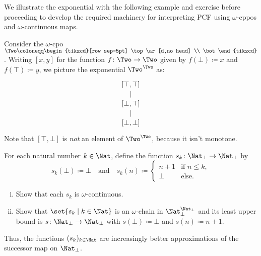 We illustrate the exponential with the following example and exercise before
proceeding to develop the required machinery for interpreting PCF using
\(\omega\)-cppos and \(\omega\)-continuous maps.

\begin{example}
  Consider the \(\omega\)-cpo \(\Two \coloneqq
  \begin{tikzcd}[row sep=5pt]
    \top \ar[d,no head] \\ \bot
  \end{tikzcd}\). Writing \([x,y]\) for the function
  \({f \colon \Two \to \Two}\) given by \(f(\bot) \coloneqq x\) and
  \(f(\top) \coloneqq y\), we picture the exponential \(\Two^\Two\) as:
  \[
  \begin{tikzcd}[row sep=10pt]
    {[\top,\top]} \ar[d, no head] \\
    {[\bot,\top]} \ar[d, no head] \\
    {[\bot,\bot]}
  \end{tikzcd}
  \]
  Note that \([\top,\bot]\) is \emph{not} an element of \(\Two^\Two\), because
  it isn't monotone.
\end{example}

\begin{exercise}\label{exer:approximating-successor}
  For each natural number \(k \in \Nat\), define the function
  \(s_k \colon \Nat_\bot \to \Nat_\bot\) by
  \[
    s_k(\bot) \coloneqq \bot
    \quad\text{and}\quad
    s_k(n) \coloneqq
    \begin{cases}
      n+1 &\text{if \(n \leq k\)},
      \\ \bot &\text{else}.
    \end{cases}
  \]
  \begin{enumerate}[(i)]
  \item Show that each \(s_k\) is \(\omega\)-continuous.
  \item Show that \(\set{s_k \mid k \in \Nat}\) is an \(\omega\)-chain in
    \(\Nat_\bot^{\Nat_\bot}\) and its least upper bound is
    \(s \colon \Nat_\bot \to \Nat_\bot\) with \(s(\bot) \coloneqq \bot\) and
    \(s(n) \coloneqq n+1\).
  \end{enumerate}
  Thus, the functions \((s_k)_{k \in \Nat}\) are increasingly better approximations of the
  successor map on \(\Nat_\bot\).
\end{exercise}

